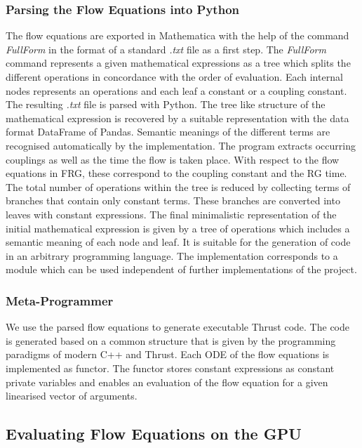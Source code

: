 \documentclass[paper=a4,11pt,bibliography=totoc]{scrartcl}
\begin{document}
\subsubsection{Parsing the Flow Equations into Python}

The flow equations are exported in Mathematica with the help of the command \textit{FullForm} in the format of a standard \textit{.txt} file as a first step. The \textit{FullForm} command represents a given mathematical expressions as a tree which splits the different operations in concordance with the order of evaluation. Each internal nodes represents an operations and each leaf a constant or a coupling constant. The resulting \textit{.txt} file is parsed with Python. The tree like structure of the mathematical expression is recovered by a suitable representation with the data format DataFrame of Pandas. Semantic meanings of the different terms are recognised automatically by the implementation. The program extracts occurring couplings as well as the time the flow is taken place. With respect to the flow equations in FRG, these correspond to the coupling constant and the RG time. The total number of operations within the tree is reduced by collecting terms of branches that contain only constant terms. These branches are converted into leaves with constant expressions. The final minimalistic representation of the initial mathematical expression is given by a tree of operations which includes a semantic meaning of each node and leaf. It is suitable for the generation of code in an arbitrary programming language. The implementation corresponds to a module which can be used independent of further implementations of the project.

\subsubsection{Meta-Programmer}

We use the parsed flow equations to generate executable Thrust code. The code is generated based on a common structure that is given by the programming paradigms of modern C++ and Thrust. Each ODE of the flow equations is implemented as functor. The functor stores constant expressions as constant private variables and enables an evaluation of the flow equation for a given linearised vector of arguments. 

\subsection{Evaluating Flow Equations on the GPU}
\end{document}
